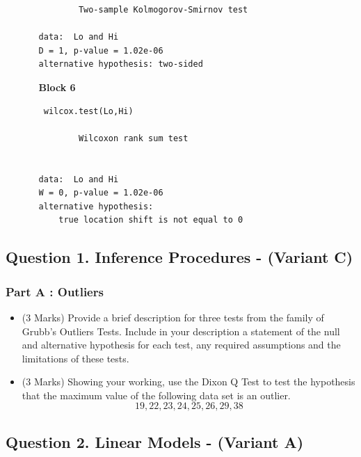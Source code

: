\documentclass[a4paper,12pt]{article}
\begin{document}
\begin{itemize}
\begin{itemize}
\begin{framed}
\begin{verbatim}
        Two-sample Kolmogorov-Smirnov test

data:  Lo and Hi
D = 1, p-value = 1.02e-06
alternative hypothesis: two-sided

\end{verbatim}
\end{framed}
\item[\textbf{Block 6}]
\begin{framed}
\begin{verbatim}
 wilcox.test(Lo,Hi)

        Wilcoxon rank sum test


data:  Lo and Hi
W = 0, p-value = 1.02e-06
alternative hypothesis: 
	true location shift is not equal to 0

\end{verbatim}
\end{framed}
\end{itemize}

\end{itemize} %

\newpage
\newpage
\subsection*{Question 1. Inference Procedures - (Variant C) }
\subsubsection*{Part A : Outliers}
\begin{itemize}
\item (3 Marks) Provide a brief description for three tests from the family of Grubb's  Outliers Tests. Include in your description a statement of the null and alternative hypothesis for each test, any required assumptions and the limitations of these tests.
\item (3 Marks) Showing your working, use the Dixon Q Test to test the hypothesis that the maximum value of the following data set is an outlier.
\[ 19,22,23,24,25,26,29,38\]
\end{itemize}	

\newpage
\subsection*{Question 2. Linear Models - (Variant A) }
	
\end{document}
